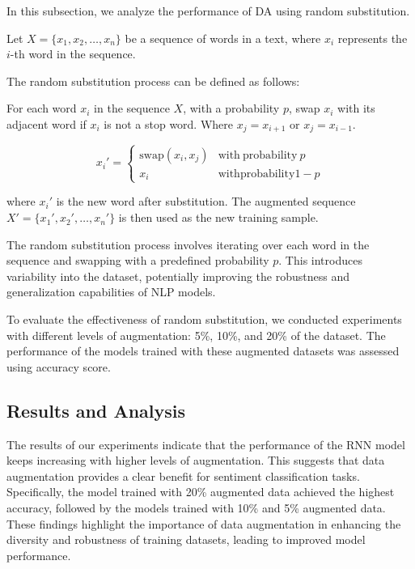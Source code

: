 \documentclass{article}
\begin{document}
In this subsection, we analyze the performance of DA using random substitution.

Let \( X = \{x_1, x_2, \ldots, x_n\} \) be a sequence of words in a text, where
\( x_i \) represents the \( i \)-th word in the sequence.

The random substitution process can be defined as follows:

For each word \( x_i \) in the sequence \( X \), with a probability \( p \),
swap \( x_i \) with its adjacent word if \( x_i \) is not a stop word. Where
\(x_j = x_{i+1}\) or \(x_j = x_{i-1}\).

\[
  x_i' =
  \begin{cases}
    \mathrm{swap}(x_i,x_j) & \mathrm{with\ probability\ } p   \\
    x_i                    & \mathrm{with probability } 1 - p
  \end{cases}
\]

where \( x_i' \) is the new word after substitution. The augmented sequence \(
X' = \{x_1', x_2', \ldots, x_n'\} \) is then used as the new training sample.

The random substitution process involves iterating over each word in the
sequence and swapping with a predefined probability \( p \). This introduces
variability into the dataset, potentially improving the robustness and
generalization capabilities of NLP models.

To evaluate the effectiveness of random substitution, we conducted experiments
with different levels of augmentation: 5\%, 10\%, and 20\% of the dataset. The
performance of the models trained with these augmented datasets was assessed
using accuracy score.

\subsection{Results and Analysis}

The results of our experiments indicate that the performance of the RNN model
keeps increasing with higher levels of augmentation. This suggests that data
augmentation provides a clear benefit for sentiment classification tasks.
Specifically, the model trained with 20\% augmented data achieved the highest
accuracy, followed by the models trained with 10\% and 5\% augmented data.
These findings highlight the importance of data augmentation in enhancing the
diversity and robustness of training datasets, leading to improved model
performance.
\end{document}
